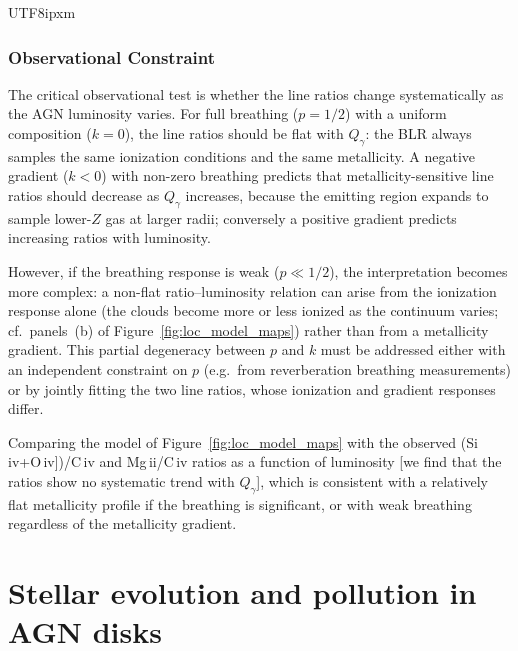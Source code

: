 \documentclass[linenumbers,trackchanges]{aastex701}
\begin{document}
\begin{CJK*}{UTF8}{ipxm}
\subsubsection{Observational Constraint}

The critical observational test is whether the line ratios change systematically as the
AGN luminosity varies.  For full breathing ($p=1/2$) with a uniform composition ($k=0$),
the line ratios should be flat with $Q_\gamma$: the BLR always samples the same ionization
conditions and the same metallicity.  A negative gradient ($k<0$) with non-zero breathing
predicts that metallicity-sensitive line ratios should decrease as $Q_\gamma$ increases,
because the emitting region expands to sample lower-$Z$ gas at larger radii; conversely a
positive gradient predicts increasing ratios with luminosity.

However, if the breathing response is weak ($p\ll1/2$), the interpretation becomes more
complex: a non-flat ratio--luminosity relation can arise from the ionization response alone
(the clouds become more or less ionized as the continuum varies; cf.\ panels~(b) of
Figure~\ref{fig:loc_model_maps}) rather than from a metallicity gradient.  This partial
degeneracy between $p$ and $k$ must be addressed either with an independent constraint on $p$
(e.g.\ from reverberation breathing measurements) or by jointly fitting the two line ratios,
whose ionization and gradient responses differ.

Comparing the model of Figure~\ref{fig:loc_model_maps} with the observed
(Si\,{\sc iv}+O\,{\sc iv}])/C\,{\sc iv} and Mg\,{\sc ii}/C\,{\sc iv} ratios as a function of
luminosity [we find that the ratios show no systematic trend with $Q_\gamma$], which is
consistent with a relatively flat metallicity profile if the breathing is significant, or
with weak breathing regardless of the metallicity gradient.

\section{Stellar evolution and pollution in AGN disks}
\label{sec:sepad}


\end{CJK*}
\end{document}
